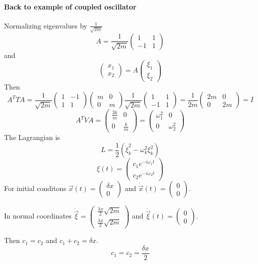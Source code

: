 \paragraph{Back to example of coupled oscillator}
Normalizing eigenvalues by $\frac{1}{\sqrt{2m}}$
$$A = \frac{1}{\sqrt{2m}} \begin{pmatrix} 1&1\\-1&1\end{pmatrix}$$
and
$$\begin{pmatrix}
x_1\\x_2
\end{pmatrix} = A \begin{pmatrix} \xi_1\\\xi_2 \end{pmatrix}$$
Then
$$A^T T A = \frac{1}{\sqrt{2m}} \begin{pmatrix} 1&-1\\1&1\end{pmatrix} \begin{pmatrix}m&0\\0&m\end{pmatrix} \frac{1}{\sqrt{2m}}\begin{pmatrix} 1&1\\-1&1\end{pmatrix} = \frac{1}{2m} \begin{pmatrix}2m&0\\0&2m\end{pmatrix}  = I$$
$$A^TVA =  \begin{pmatrix}\frac{3k}{m}&0\\0&\frac{k}{m}\end{pmatrix} =  \begin{pmatrix}\omega_1^2&0\\0&\omega_2^2\end{pmatrix}$$
The Lagrangian is
$$L = \frac{1}{2} \left( \dot{\xi}^2_k - \omega^2_k \xi^2_k \right)$$
$$\xi(t) = \begin{pmatrix} c_1e^{-i\omega_1 t} \\c_2e^{-i\omega_2 t} \end{pmatrix}$$
For initial conditons $\vec{x}(t) = \begin{pmatrix}\delta x \\ 0\end{pmatrix}$ and $\dot{\vec{x}}(t) = \begin{pmatrix}0 \\ 0\end{pmatrix}$.

In normal coordinates
$\dot{\vec{\xi}} = \begin{pmatrix}\frac{\lambda x}{2} \sqrt{2m} \\\frac{\lambda x}{2} \sqrt{2m}\end{pmatrix}$ and  $\dot{\vec{\xi}}(t) = \begin{pmatrix}0 \\ 0\end{pmatrix}$.

Then $c_1=c_2$ and $c_1+c_2 = \delta x$.
$$c_1=c_2 = \frac{\delta x}{2}$$